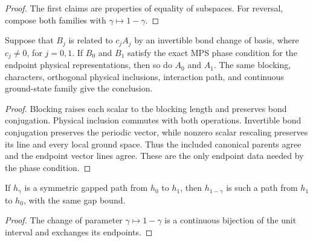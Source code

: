 \begin{proof}\leanok
    The first claims are properties of equality of subspaces. For reversal,
    compose both families with $\gamma\mapsto1-\gamma$.
\end{proof}

\begin{lemma}
    \label{thm:spt_exact_phase_gauge_invariance}
    \leanok
    Suppose that $B_j$ is related to $c_j A_j$ by an invertible bond
    change of basis, where $c_j\ne0$, for $j=0,1$. If $B_0$ and $B_1$
    satisfy the exact MPS phase condition for the endpoint physical
    representations, then so do $A_0$ and $A_1$. The same blocking,
    characters, orthogonal physical inclusions, interaction path, and
    continuous ground-state family give the conclusion.
\end{lemma}

\begin{proof}\leanok
    Blocking raises each scalar to the blocking length and preserves
    bond conjugation. Physical inclusion commutes with both operations.
    Invertible bond conjugation preserves the periodic vector, while
    nonzero scalar rescaling preserves its line and every local
    ground space. Thus the included canonical parents agree and the
    endpoint vector lines agree. These are the only endpoint data
    needed by the phase condition.
\end{proof}

\begin{lemma}
    \label{thm:spt_common_space_path_reversal}
    \leanok
    If $h_\gamma$ is a symmetric gapped path from $h_0$ to $h_1$, then
    $h_{1-\gamma}$ is such a path from $h_1$ to $h_0$, with the same gap bound.
\end{lemma}

\begin{proof}\leanok
    The change of parameter $\gamma\mapsto1-\gamma$ is a continuous
    bijection of the unit interval and exchanges its endpoints.
\end{proof}


